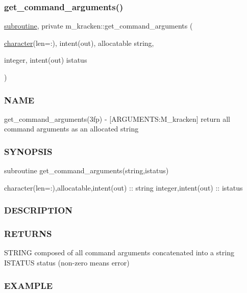 \subsubsection{\texorpdfstring{get\+\_\+command\+\_\+arguments()}{get\_command\_arguments()}}
{\footnotesize\ttfamily \hyperlink{M__stopwatch_83_8txt_acfbcff50169d691ff02d4a123ed70482}{subroutine}, private m\+\_\+kracken\+::get\+\_\+command\+\_\+arguments (\begin{DoxyParamCaption}\item[{\hyperlink{option__stopwatch_83_8txt_abd4b21fbbd175834027b5224bfe97e66}{character}(len=\+:), intent(out), allocatable}]{string,  }\item[{integer, intent(out)}]{istatus }\end{DoxyParamCaption})\hspace{0.3cm}{\ttfamily [private]}}



\subsubsection*{N\+A\+ME}

get\+\_\+command\+\_\+arguments(3fp) -\/ \mbox{[}A\+R\+G\+U\+M\+E\+N\+TS\+:M\+\_\+kracken\mbox{]} return all command arguments as an allocated string 

\subsubsection*{S\+Y\+N\+O\+P\+S\+IS}

subroutine get\+\_\+command\+\_\+arguments(string,istatus)

character(len=\+:),allocatable,intent(out) \+:\+: string integer,intent(out) \+:\+: istatus \subsubsection*{D\+E\+S\+C\+R\+I\+P\+T\+I\+ON}

\subsubsection*{R\+E\+T\+U\+R\+NS}

S\+T\+R\+I\+NG composed of all command arguments concatenated into a string I\+S\+T\+A\+T\+US status (non-\/zero means error)

\subsubsection*{E\+X\+A\+M\+P\+LE}


